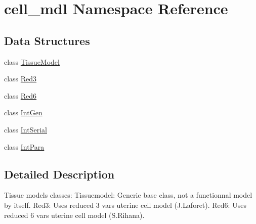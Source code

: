 \hypertarget{namespacecell__mdl}{
\section{cell\_\-mdl Namespace Reference}
\label{namespacecell__mdl}
}
\subsection*{Data Structures}
\begin{DoxyCompactItemize}
\item 
class \hyperlink{classcell__mdl_1_1_tissue_model}{TissueModel}
\item 
class \hyperlink{classcell__mdl_1_1_red3}{Red3}
\item 
class \hyperlink{classcell__mdl_1_1_red6}{Red6}
\item 
class \hyperlink{classcell__mdl_1_1_int_gen}{IntGen}
\item 
class \hyperlink{classcell__mdl_1_1_int_serial}{IntSerial}
\item 
class \hyperlink{classcell__mdl_1_1_int_para}{IntPara}
\end{DoxyCompactItemize}


\subsection{Detailed Description}
\begin{DoxyVerb}Tissue models classes:
Tissuemodel: Generic base class, not a functionnal model by itself.
Red3: Uses reduced 3 vars uterine cell model (J.Laforet).
Red6: Uses reduced 6 vars uterine cell model (S.Rihana).\end{DoxyVerb}
 